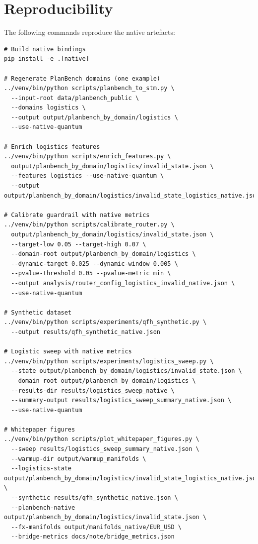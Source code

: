 \documentclass[11pt]{article}
\begin{document}
\appendix
\section{Reproducibility}
The following commands reproduce the native artefacts:
\begin{verbatim}
# Build native bindings
pip install -e .[native]

# Regenerate PlanBench domains (one example)
../venv/bin/python scripts/planbench_to_stm.py \
  --input-root data/planbench_public \
  --domains logistics \
  --output output/planbench_by_domain/logistics \
  --use-native-quantum

# Enrich logistics features
../venv/bin/python scripts/enrich_features.py \
  output/planbench_by_domain/logistics/invalid_state.json \
  --features logistics --use-native-quantum \
  --output output/planbench_by_domain/logistics/invalid_state_logistics_native.json

# Calibrate guardrail with native metrics
../venv/bin/python scripts/calibrate_router.py \
  output/planbench_by_domain/logistics/invalid_state.json \
  --target-low 0.05 --target-high 0.07 \
  --domain-root output/planbench_by_domain/logistics \
  --dynamic-target 0.025 --dynamic-window 0.005 \
  --pvalue-threshold 0.05 --pvalue-metric min \
  --output analysis/router_config_logistics_invalid_native.json \
  --use-native-quantum

# Synthetic dataset
../venv/bin/python scripts/experiments/qfh_synthetic.py \
  --output results/qfh_synthetic_native.json

# Logistic sweep with native metrics
../venv/bin/python scripts/experiments/logistics_sweep.py \
  --state output/planbench_by_domain/logistics/invalid_state.json \
  --domain-root output/planbench_by_domain/logistics \
  --results-dir results/logistics_sweep_native \
  --summary-output results/logistics_sweep_summary_native.json \
  --use-native-quantum

# Whitepaper figures
../venv/bin/python scripts/plot_whitepaper_figures.py \
  --sweep results/logistics_sweep_summary_native.json \
  --warmup-dir output/warmup_manifolds \
  --logistics-state output/planbench_by_domain/logistics/invalid_state_logistics_native.json \
  --synthetic results/qfh_synthetic_native.json \
  --planbench-native output/planbench_by_domain/logistics/invalid_state.json \
  --fx-manifolds output/manifolds_native/EUR_USD \
  --bridge-metrics docs/note/bridge_metrics.json
\end{verbatim}
\end{document}

